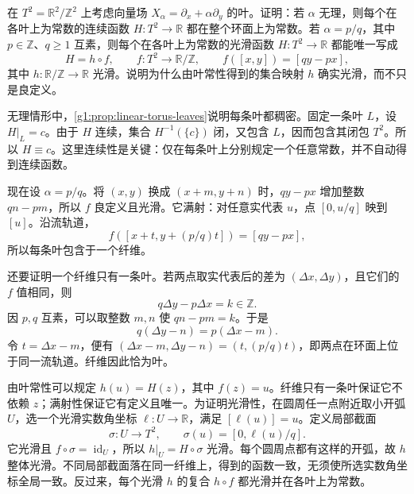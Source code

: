 \begin{exercise}
	\label{g1:exr:1305-leaf-constant-functions}
	在 \(T^2=\mathbb R^2/\mathbb Z^2\) 上考虑向量场 \(X_\alpha=\partial_x+\alpha\partial_y\) 的叶。证明：若 \(\alpha\) 无理，则每个在各叶上为常数的连续函数 \(H:T^2\to\mathbb R\) 都在整个环面上为常数。若 \(\alpha=p/q\)，其中 \(p\in\mathbb Z\)、\(q\ge1\) 互素，则每个在各叶上为常数的光滑函数 \(H:T^2\to\mathbb R\) 都能唯一写成
	\[
		H=h\circ f,\qquad
		f:T^2\longrightarrow\mathbb R/\mathbb Z,\qquad
		f([x,y])=[qy-px],
	\]
	其中 \(h:\mathbb R/\mathbb Z\to\mathbb R\) 光滑。说明为什么由叶常性得到的集合映射 \(h\) 确实光滑，而不只是良定义。
\end{exercise}
\begin{solution}
	无理情形中，\cref{g1:prop:linear-torus-leaves}说明每条叶都稠密。固定一条叶 \(L\)，设 \(H|_L=c\)。由于 \(H\) 连续，集合 \(H^{-1}(\{c\})\) 闭，又包含 \(L\)，因而包含其闭包 \(T^2\)。所以 \(H\equiv c\)。这里连续性是关键：仅在每条叶上分别规定一个任意常数，并不自动得到连续函数。

	现在设 \(\alpha=p/q\)。将 \((x,y)\) 换成 \((x+m,y+n)\) 时，\(qy-px\) 增加整数 \(qn-pm\)，所以 \(f\) 良定义且光滑。它满射：对任意实代表 \(u\)，点 \([0,u/q]\) 映到 \([u]\)。沿流轨道，
	\[
		f([x+t,y+(p/q)t])=[qy-px],
	\]
	所以每条叶包含于一个纤维。

	还要证明一个纤维只有一条叶。若两点取实代表后的差为 \((\Delta x,\Delta y)\)，且它们的 \(f\) 值相同，则
	\[
		q\Delta y-p\Delta x=k\in\mathbb Z.
	\]
	因 \(p,q\) 互素，可以取整数 \(m,n\) 使 \(qn-pm=k\)。于是
	\[
		q(\Delta y-n)=p(\Delta x-m).
	\]
	令 \(t=\Delta x-m\)，便有 \((\Delta x-m,\Delta y-n)=(t,(p/q)t)\)，即两点在环面上位于同一流轨道。纤维因此恰为叶。

	由叶常性可以规定 \(h(u)=H(z)\)，其中 \(f(z)=u\)。纤维只有一条叶保证它不依赖 \(z\)；满射性保证它有定义且唯一。为证明光滑性，在圆周任一点附近取小开弧 \(U\)，选一个光滑实数角坐标 \(\ell:U\to\mathbb R\)，满足 \([\ell(u)]=u\)。定义局部截面
	\[
		\sigma:U\longrightarrow T^2,\qquad
		\sigma(u)=[0,\ell(u)/q].
	\]
	它光滑且 \(f\circ\sigma=\operatorname{id}_U\)，所以 \(h|_U=H\circ\sigma\) 光滑。每个圆周点都有这样的开弧，故 \(h\) 整体光滑。不同局部截面落在同一纤维上，得到的函数一致，无须使所选实数角坐标全局一致。反过来，每个光滑 \(h\) 的复合 \(h\circ f\) 都光滑并在各叶上为常数。
\end{solution}

